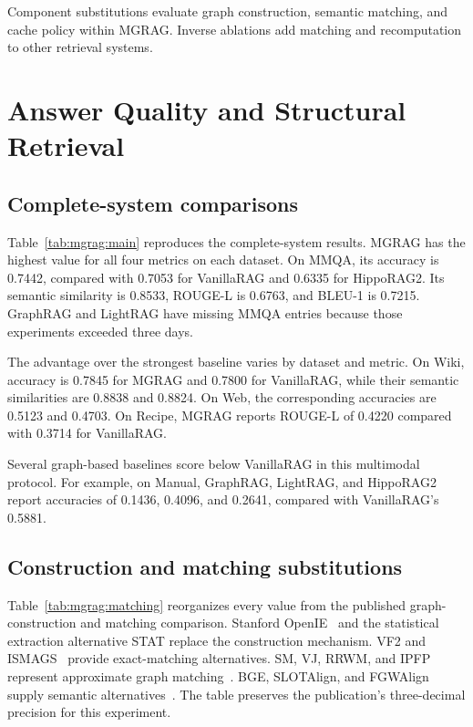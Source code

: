 Component substitutions evaluate graph construction, semantic matching, and cache policy within MGRAG. Inverse ablations add matching and recomputation to other retrieval systems.

\section{Answer Quality and Structural Retrieval}
\label{sec:mgrag:results}

\subsection{Complete-system comparisons}

Table~\ref{tab:mgrag:main} reproduces the complete-system results. MGRAG has the highest value for all four metrics on each dataset. On MMQA, its accuracy is 0.7442, compared with 0.7053 for VanillaRAG and 0.6335 for HippoRAG2. Its semantic similarity is 0.8533, ROUGE-L is 0.6763, and BLEU-1 is 0.7215. GraphRAG and LightRAG have missing MMQA entries because those experiments exceeded three days.



The advantage over the strongest baseline varies by dataset and metric. On Wiki, accuracy is 0.7845 for MGRAG and 0.7800 for VanillaRAG, while their semantic similarities are 0.8838 and 0.8824. On Web, the corresponding accuracies are 0.5123 and 0.4703. On Recipe, MGRAG reports ROUGE-L of 0.4220 compared with 0.3714 for VanillaRAG.

Several graph-based baselines score below VanillaRAG in this multimodal protocol. For example, on Manual, GraphRAG, LightRAG, and HippoRAG2 report accuracies of 0.1436, 0.4096, and 0.2641, compared with VanillaRAG's 0.5881.

\subsection{Construction and matching substitutions}

Table~\ref{tab:mgrag:matching} reorganizes every value from the published graph-construction and matching comparison. Stanford OpenIE~\cite{mgrag-angeli2015leveraging} and the statistical extraction alternative STAT replace the construction mechanism. VF2 and ISMAGS~\cite{mgrag-cordella2004sub,mgrag-houbraken2014index} provide exact-matching alternatives. SM, VJ, RRWM, and IPFP represent approximate graph matching~\cite{mgrag-leordeanu2005spectral,mgrag-fankhauser2011speeding,mgrag-cho2010reweighted,mgrag-leordeanu2009integer}. BGE, SLOTAlign, and FGWAlign supply semantic alternatives~\cite{mgrag-bge_embedding,mgrag-tang2023robust,mgrag-tang2025fused}. The table preserves the publication's three-decimal precision for this experiment.

